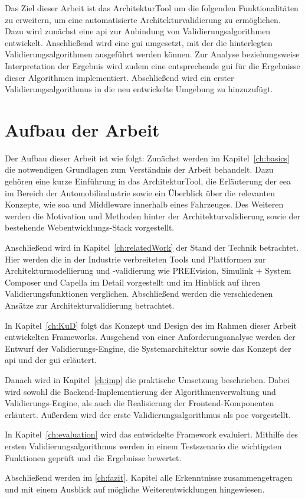 Das Ziel dieser Arbeit ist das ArchitekturTool um die folgenden Funktionalitäten zu erweitern, um eine automatisierte Architekturvalidierung zu ermöglichen. Dazu wird zunächst eine \gls{api} zur Anbindung von Validierungsalgorithmen entwickelt. Anschließend wird eine \gls{gui} umgesetzt, mit der die hinterlegten Validierungsalgorithmen ausgeführt werden können. Zur Analyse beziehungsweise Interpretation der Ergebnis wird zudem eine entsprechende \gls{gui} für die Ergebnisse dieser Algorithmen implementiert. Abschließend wird ein erster Validierungsalgorithmus in die neu entwickelte Umgebung zu hinzuzufügt.
\section{Aufbau der Arbeit}
\label{sec:aufbau}

Der Aufbau dieser Arbeit ist wie folgt: Zunächst werden im Kapitel~\ref{ch:basics} die notwendigen Grundlagen zum Verständnis der Arbeit behandelt. Dazu gehören eine kurze Einführung in das ArchitekturTool, die Erläuterung der \gls{eea} im Bereich der Automobilindustrie sowie ein Überblick über die relevanten Konzepte, wie \gls{soa} und Middleware innerhalb eines Fahrzeuges. Des Weiteren werden die Motivation und Methoden hinter der Architekturvalidierung sowie der bestehende Webentwicklungs-Stack vorgestellt.

Anschließend wird in Kapitel~\ref{ch:relatedWork} der Stand der Technik betrachtet. Hier werden die in der Industrie verbreiteten Tools und Plattformen zur Architekturmodellierung und -validierung wie PREEvision, Simulink + System Composer und Capella im Detail vorgestellt und im Hinblick auf ihren Validierungsfunktionen verglichen. Abschließend werden die verschiedenen Ansätze zur Architekturvalidierung betrachtet.

In Kapitel~\ref{ch:KuD} folgt das Konzept und Design des im Rahmen dieser Arbeit entwickelten Frameworks. Ausgehend von einer Anforderungsanalyse werden der Entwurf der Validierungs-Engine, die Systemarchitektur sowie das Konzept der \gls{api} und der \gls{gui} erläutert.

Danach wird in Kapitel~\ref{ch:imp} die praktische Umsetzung beschrieben. Dabei wird sowohl die Backend-Implementierung der Algorithmenverwaltung und Validierungs-Engine, als auch die Realisierung der Frontend-Komponenten erläutert. Außerdem wird der erste Validierungsalgorithmus als \gls{poc} vorgestellt.

In Kapitel~\ref{ch:evaluation} wird das entwickelte Framework evaluiert. Mithilfe des ersten Validierungsalgorithmus werden in einem Testszenario die wichtigsten Funktionen geprüft und die Ergebnisse bewertet.

Abschließend werden im \ref{ch:fazit}. Kapitel alle Erkenntnisse zusammengetragen und mit einem Ausblick auf mögliche Weiterentwicklungen hingewiesen.